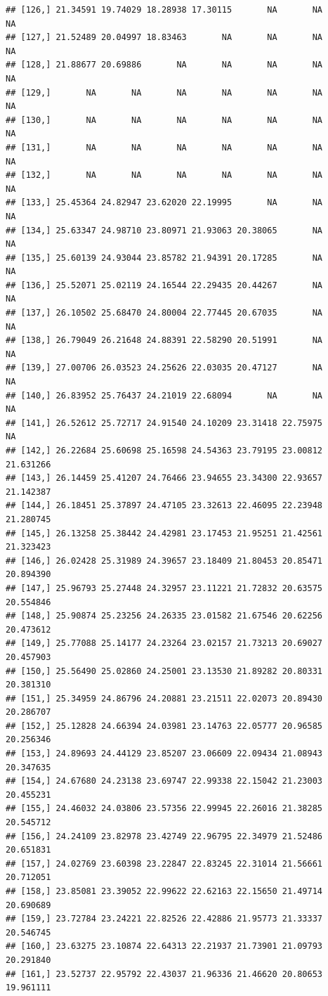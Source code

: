 \documentclass{article}\usepackage[]{graphicx}\usepackage[]{color}
\makeatletter
\newenvironment{kframe}{%
 \def\at@end@of@kframe{}%
 \ifinner\ifhmode%
  \def\at@end@of@kframe{\end{minipage}}%
  \begin{minipage}{\columnwidth}%
 \fi\fi%
 \def\FrameCommand##1{\hskip\@totalleftmargin \hskip-\fboxsep
 \colorbox{shadecolor}{##1}\hskip-\fboxsep
     \hskip-\linewidth \hskip-\@totalleftmargin \hskip\columnwidth}%
 \MakeFramed {\advance\hsize-\width
   \@totalleftmargin\z@ \linewidth\hsize
   \@setminipage}}%
 {\par\unskip\endMakeFramed%
 \at@end@of@kframe}
\newenvironment{knitrout}{}{} %
\makeatother
\begin{document}
\begin{knitrout}
\begin{kframe}
\begin{verbatim}
## [126,] 21.34591 19.74029 18.28938 17.30115       NA       NA        NA
## [127,] 21.52489 20.04997 18.83463       NA       NA       NA        NA
## [128,] 21.88677 20.69886       NA       NA       NA       NA        NA
## [129,]       NA       NA       NA       NA       NA       NA        NA
## [130,]       NA       NA       NA       NA       NA       NA        NA
## [131,]       NA       NA       NA       NA       NA       NA        NA
## [132,]       NA       NA       NA       NA       NA       NA        NA
## [133,] 25.45364 24.82947 23.62020 22.19995       NA       NA        NA
## [134,] 25.63347 24.98710 23.80971 21.93063 20.38065       NA        NA
## [135,] 25.60139 24.93044 23.85782 21.94391 20.17285       NA        NA
## [136,] 25.52071 25.02119 24.16544 22.29435 20.44267       NA        NA
## [137,] 26.10502 25.68470 24.80004 22.77445 20.67035       NA        NA
## [138,] 26.79049 26.21648 24.88391 22.58290 20.51991       NA        NA
## [139,] 27.00706 26.03523 24.25626 22.03035 20.47127       NA        NA
## [140,] 26.83952 25.76437 24.21019 22.68094       NA       NA        NA
## [141,] 26.52612 25.72717 24.91540 24.10209 23.31418 22.75975        NA
## [142,] 26.22684 25.60698 25.16598 24.54363 23.79195 23.00812 21.631266
## [143,] 26.14459 25.41207 24.76466 23.94655 23.34300 22.93657 21.142387
## [144,] 26.18451 25.37897 24.47105 23.32613 22.46095 22.23948 21.280745
## [145,] 26.13258 25.38442 24.42981 23.17453 21.95251 21.42561 21.323423
## [146,] 26.02428 25.31989 24.39657 23.18409 21.80453 20.85471 20.894390
## [147,] 25.96793 25.27448 24.32957 23.11221 21.72832 20.63575 20.554846
## [148,] 25.90874 25.23256 24.26335 23.01582 21.67546 20.62256 20.473612
## [149,] 25.77088 25.14177 24.23264 23.02157 21.73213 20.69027 20.457903
## [150,] 25.56490 25.02860 24.25001 23.13530 21.89282 20.80331 20.381310
## [151,] 25.34959 24.86796 24.20881 23.21511 22.02073 20.89430 20.286707
## [152,] 25.12828 24.66394 24.03981 23.14763 22.05777 20.96585 20.256346
## [153,] 24.89693 24.44129 23.85207 23.06609 22.09434 21.08943 20.347635
## [154,] 24.67680 24.23138 23.69747 22.99338 22.15042 21.23003 20.455231
## [155,] 24.46032 24.03806 23.57356 22.99945 22.26016 21.38285 20.545712
## [156,] 24.24109 23.82978 23.42749 22.96795 22.34979 21.52486 20.651831
## [157,] 24.02769 23.60398 23.22847 22.83245 22.31014 21.56661 20.712051
## [158,] 23.85081 23.39052 22.99622 22.62163 22.15650 21.49714 20.690689
## [159,] 23.72784 23.24221 22.82526 22.42886 21.95773 21.33337 20.546745
## [160,] 23.63275 23.10874 22.64313 22.21937 21.73901 21.09793 20.291840
## [161,] 23.52737 22.95792 22.43037 21.96336 21.46620 20.80653 19.961111

\end{verbatim}
\end{kframe}
\end{knitrout}
\end{document}
